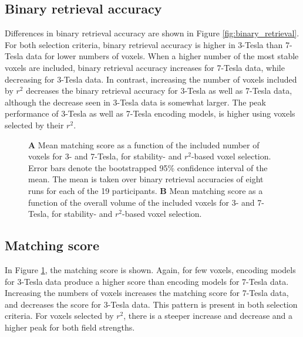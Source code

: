 \subsection*{Binary retrieval accuracy}

Differences in binary retrieval accuracy are shown in Figure \ref{fig:binary_retrieval}. For both selection criteria, binary retrieval
accuracy is higher in 3-Tesla than 7-Tesla data for lower numbers of voxels.
When a higher number of the most stable voxels are included, binary retrieval accuracy increases for 7-Tesla data, while decreasing for 3-Tesla data.    
In contrast, increasing the number of voxels included by $r^2$ decreases the
binary retrieval accuracy for 3-Tesla as well as 7-Tesla data, although the
decrease seen in 3-Tesla data is somewhat larger. The peak
performance of 3-Tesla as well as 7-Tesla encoding models, is higher using
voxels selected by their $r^2$.


\begin{figure}
  \centering
  \def\svgwidth{\linewidth}
  
	
  \caption{\textbf{A} Mean matching score as a function of the included number of
  voxels for 3- and 7-Tesla, for stability- and $r^2$-based voxel selection. Error bars denote the bootstrapped 95\% confidence
  interval of the mean. The mean is taken over binary retrieval accuracies of
  eight runs for each of the 19 participants. \textbf{B} Mean matching score as a function of the overall volume of
	  the included voxels for 3- and 7-Tesla, for stability- and $r^2$-based voxel selection.}

 \label{fig:matching_score}
\end{figure}



\subsection*{Matching score}

In Figure \ref{fig:matching_score}, the matching score is shown. Again, for
few voxels, encoding models for 3-Tesla data produce a higher score than encoding
models for 7-Tesla data. Increasing the numbers of voxels increases the matching
score for 7-Tesla data, and decreases the score for 3-Tesla data. This pattern
is present in both selection criteria. For voxels selected by $r^2$, there is a
steeper increase and decrease and a higher peak for both field strengths.

